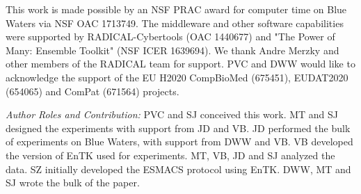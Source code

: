 \footnotesize

This work is made possible by an NSF PRAC award for computer time on Blue Waters via
NSF OAC	1713749. The middleware and other software capabilities were supported by RADICAL-Cybertools (OAC 1440677) and "The Power of Many: Ensemble Toolkit" (NSF ICER 1639694). We thank Andre Merzky and other members of the RADICAL team for support. PVC and DWW would like to acknowledge the support of the EU H2020 CompBioMed (675451), EUDAT2020 (654065) and ComPat (671564) projects.

{\it Author Roles and Contribution:} PVC and SJ conceived this work. MT and SJ
designed the experiments with support from JD and VB. JD performed the bulk of
experiments on Blue Waters, with support from DWW and VB. VB developed the
version of EnTK used for experiments. MT, VB, JD and SJ analyzed the data. SZ
initially developed the ESMACS protocol using EnTK. DWW, MT and SJ wrote the
bulk of the paper.







